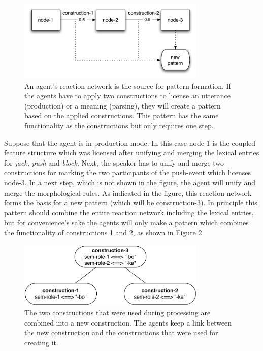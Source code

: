 \begin{figure}[htb]
\centerline{\includegraphics[width=0.8\textwidth]{Chapter4/figs/reaction1}}
  \caption[A reaction network as a source for pattern formation]{An agent's reaction network is the source for pattern formation. If the agents have to apply two constructions to license an utterance (production) or a meaning (parsing), they will create a pattern based on the applied constructions. This pattern has the same functionality as the constructions but only requires one step.}
   \label{f:reaction1}
\end{figure}

Suppose that the agent is in production mode. In this case node-1 is the coupled feature structure which was licensed after unifying and merging the lexical entries for {\em jack, push} and {\em block}. Next, the speaker has to unify and merge two constructions for marking the two participants of the push-event which licenses node-3. In a next step, which is not shown in the figure, the agent will unify and merge the morphological rules. As indicated in the figure, this reaction network forms the basis for a new pattern (which will be construction-3). In principle this pattern should combine the entire reaction network including the lexical entries, but for convenience's sake the agents will only make a pattern which combines the functionality of constructions 1 and 2, as shown in Figure \ref{f:new-pattern}.
\begin{figure}[htb]
\centerline{\includegraphics[width=0.8\textwidth]{Chapter4/figs/new-pattern}}
  \caption[A new pattern]{The two constructions that were used during processing are combined into a new construction. The agents keep a link between the new construction and the constructions that were used for creating it.}
   \label{f:new-pattern}
\end{figure}

